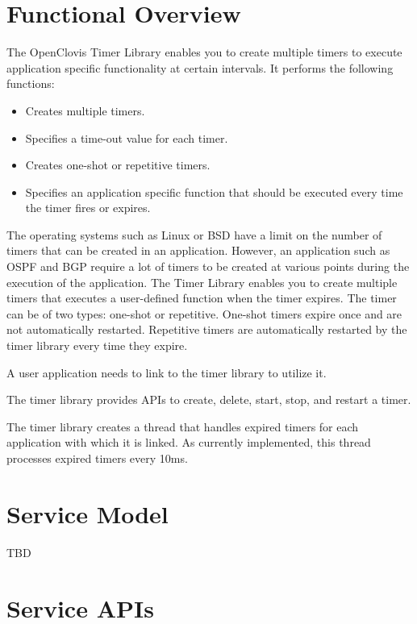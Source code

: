 
\hypertarget{group__group33}{
\chapter{Functional Overview}
\label{group__group33}
}

\begin{flushleft}
The OpenClovis Timer Library enables you to create multiple timers to execute application specific functionality 
at certain intervals. It performs the following functions:

\begin{itemize}
\item Creates multiple timers. 
\item Specifies a time-out value for each timer. 
\item Creates one-shot or repetitive timers. \item Specifies an application specific function that should be executed every time the timer fires or 
expires.
\end{itemize}

The operating systems such as Linux or BSD have a limit on the number of timers that can be created in an application. However, an 
application such as OSPF and BGP require a lot of timers to be created at various points during the execution of the application. The Timer Library 
enables you to create multiple timers that executes a user-defined function when the timer expires. The timer can be of two types: one-shot or repetitive. One-shot timers expire once and are not automatically restarted. Repetitive timers are automatically restarted by the timer library every time they expire. \par
 \par
 A user application needs to link to the timer library to utilize it. \par
 \par
 The timer library provides APIs to create, delete, start, stop, and restart a timer. \par
 \par
 The timer library creates a thread that handles expired timers for each application with which it is linked. As currently implemented, 
 this thread processes expired timers every 10ms. \par


\chapter{Service Model}
TBD
\chapter{Service APIs}



\end{flushleft}
